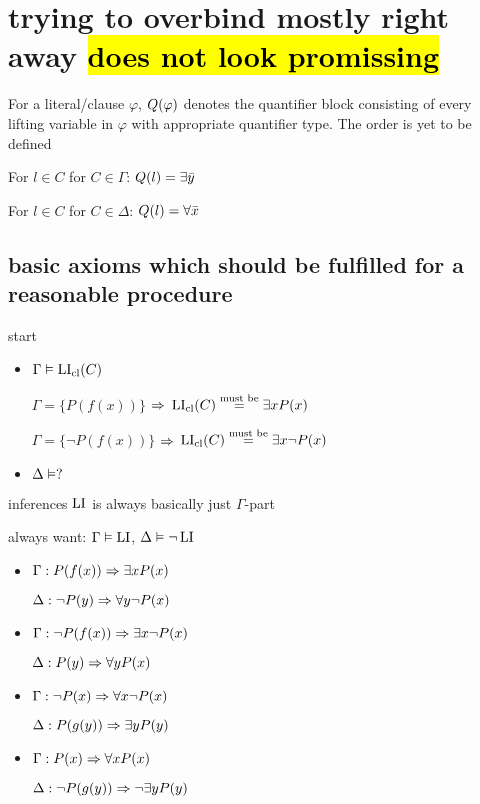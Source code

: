 \documentclass[,%
	draft=false,%
	numbers=noendperiod
	11pt,
	a4paper,
	oneside,%
	openany,
]{memoir}
\begin{document}
\chapter{ trying to overbind mostly right away \hl{does not look promissing} } 

\begin{defi}[$\Q$]
	For a literal/clause $\varphi$, $Q(\varphi)$ denotes the quantifier block consisting of every lifting variable in $\varphi$ with appropriate quantifier type.
	The order is yet to be defined
\end{defi}

For $l \in C$ for $C \in \Gamma$: $Q(l) = \exists \bar y$

For $l \in C$ for $C \in \Delta$: $Q(l) = \forall \bar x$

\section*{basic axioms which should be fulfilled for a reasonable procedure}

\noindent
start

\begin{itemize}
	\item
		$\Gamma \vDash \operatorname{LI}_{\operatorname{cl}}(C)$

		$\Gamma = \{ P(f(x)) \}$ $\Rightarrow$ $\operatorname{LI}_{\operatorname{cl}}(C) \stackrel{\text{must be}}= \exists x P(x) $

		$\Gamma = \{ \lnot P(f(x)) \}$ $\Rightarrow$ $\operatorname{LI}_{\operatorname{cl}}(C) \stackrel{\text{must be}}= \exists x \lnot P(x) $

	\item
		$\Delta \vDash ?$

\end{itemize}

\noindent
inferences $\operatorname{LI}$ is always basically just $\Gamma$-part

always want: $\Gamma \vDash \operatorname{LI}$, $\Delta \vDash \lnot \operatorname{LI}$

\begin{itemize}
	\item
		$\Gamma: P(f(x)) \Rightarrow \exists x P(x)$

		$\Delta: \lnot P(y) \Rightarrow \forall y \lnot P(x)$

	\item
		$\Gamma: \lnot P(f(x)) \Rightarrow \exists x\lnot  P(x)$

		$\Delta: P(y) \Rightarrow \forall y P(x)$

	\item
		$\Gamma: \lnot P(x) \Rightarrow \forall x \lnot P(x) $

		$\Delta: P(g(y)) \Rightarrow \exists y P(y)$

	\item
		$\Gamma: P(x) \Rightarrow \forall x P(x) $

		$\Delta: \lnot P(g(y)) \Rightarrow \lnot \exists y P(y)$

\end{itemize}
\end{document}
